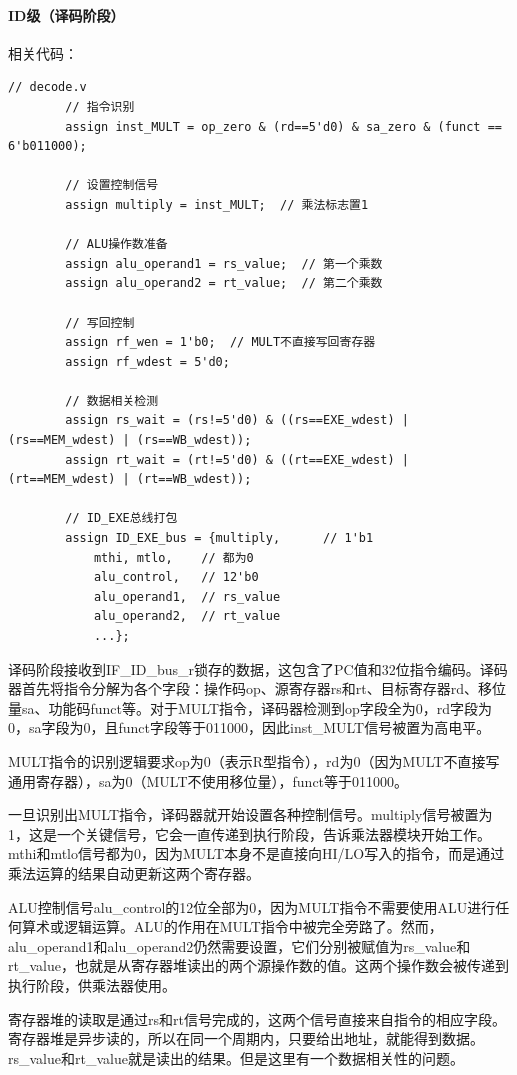\documentclass[a4paper]{article}
\begin{document}
	\paragraph{ID级（译码阶段）}
	相关代码：
	\begin{lstlisting}[caption={ID}]
		// decode.v
		// 指令识别
		assign inst_MULT = op_zero & (rd==5'd0) & sa_zero & (funct == 6'b011000);
		
		// 设置控制信号
		assign multiply = inst_MULT;  // 乘法标志置1
		
		// ALU操作数准备
		assign alu_operand1 = rs_value;  // 第一个乘数
		assign alu_operand2 = rt_value;  // 第二个乘数
		
		// 写回控制
		assign rf_wen = 1'b0;  // MULT不直接写回寄存器
		assign rf_wdest = 5'd0;
		
		// 数据相关检测
		assign rs_wait = (rs!=5'd0) & ((rs==EXE_wdest) | (rs==MEM_wdest) | (rs==WB_wdest));
		assign rt_wait = (rt!=5'd0) & ((rt==EXE_wdest) | (rt==MEM_wdest) | (rt==WB_wdest));
		
		// ID_EXE总线打包
		assign ID_EXE_bus = {multiply,      // 1'b1
			mthi, mtlo,    // 都为0
			alu_control,   // 12'b0
			alu_operand1,  // rs_value
			alu_operand2,  // rt_value
			...};
	\end{lstlisting}
	
	译码阶段接收到IF\_ID\_bus\_r锁存的数据，这包含了PC值和32位指令编码。译码器首先将指令分解为各个字段：操作码op、源寄存器rs和rt、目标寄存器rd、移位量sa、功能码funct等。对于MULT指令，译码器检测到op字段全为0，rd字段为0，sa字段为0，且funct字段等于011000，因此inst\_MULT信号被置为高电平。
	
	MULT指令的识别逻辑要求op为0（表示R型指令），rd为0（因为MULT不直接写通用寄存器），sa为0（MULT不使用移位量），funct等于011000。
	
	一旦识别出MULT指令，译码器就开始设置各种控制信号。multiply信号被置为1，这是一个关键信号，它会一直传递到执行阶段，告诉乘法器模块开始工作。mthi和mtlo信号都为0，因为MULT本身不是直接向HI/LO写入的指令，而是通过乘法运算的结果自动更新这两个寄存器。
	
	ALU控制信号alu\_control的12位全部为0，因为MULT指令不需要使用ALU进行任何算术或逻辑运算。ALU的作用在MULT指令中被完全旁路了。然而，alu\_operand1和alu\_operand2仍然需要设置，它们分别被赋值为rs\_value和rt\_value，也就是从寄存器堆读出的两个源操作数的值。这两个操作数会被传递到执行阶段，供乘法器使用。
	
	寄存器堆的读取是通过rs和rt信号完成的，这两个信号直接来自指令的相应字段。寄存器堆是异步读的，所以在同一个周期内，只要给出地址，就能得到数据。rs\_value和rt\_value就是读出的结果。但是这里有一个数据相关性的问题。
	
\end{document}
